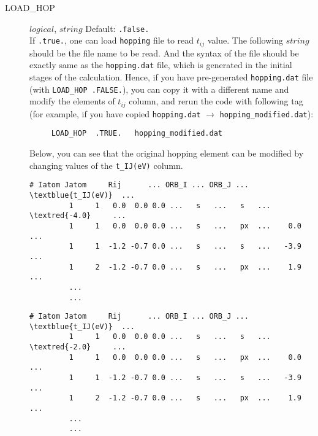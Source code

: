 \documentclass[a4paper,12pt]{scrartcl}
\makeatletter
\def\namedlabel#1#2{\begingroup
    #2%
    \def\@currentlabel{#2}%
    \phantomsection\label{#1}\endgroup
}
\newcommand{\textred}[1]{\textcolor{red!85!white}{\texttt{#1}}}
\newcommand{\textblue}[1]{\textcolor{blue!85!white}{\texttt{#1}}}
\makeatother
\begin{document}
\begin{description}
    \item[\namedlabel{tag:LOADHOP}{LOAD\_HOP}] $logical$, $string$ Default: \texttt{.false.} \\
		If \texttt{.true.}, one can load \texttt{hopping} file to read $t_{ij}$ value. The following $string$ should be the file name to be read. And the syntax of the file should be exactly same as the \texttt{hopping.dat} file, which is generated in the initial stages of the calculation.
		Hence, if you have pre-generated \texttt{hopping.dat} file (with \texttt{LOAD\_HOP .FALSE.}), you can copy it with a different name and modify the elements of $t_{ij}$ column, and rerun the code with following tag (for example, if you have copied \texttt{hopping.dat} $\rightarrow$ \texttt{hopping\_modified.dat}):
		
    \begin{verbatim}
     LOAD_HOP  .TRUE.   hopping_modified.dat
    \end{verbatim}

		Below, you can see that the original hopping element can be modified by changing values of the \textblue{t\_IJ(eV)} column.  
        \begin{Verbatim}[commandchars=\\\{\},gobble=4, frame=single, framesep=2mm, 
            label= hopping.dat example file, 
            labelposition=bottomline]
     # Iatom Jatom     Rij      ... ORB_I ... ORB_J ...  \textblue{t_IJ(eV)}  ... 
         1     1   0.0  0.0 0.0 ...   s   ...   s   ...   \textred{-4.0}     ... 
         1     1   0.0  0.0 0.0 ...   s   ...   px  ...    0.0     ... 
         1     1  -1.2 -0.7 0.0 ...   s   ...   s   ...   -3.9     ... 
         1     2  -1.2 -0.7 0.0 ...   s   ...   px  ...    1.9     ... 
         ...
         ...
        \end{Verbatim}

        \begin{Verbatim}[commandchars=\\\{\},gobble=4, frame=single, framesep=2mm, 
            label= hopping\_modified.dat example file, 
            labelposition=bottomline]
     # Iatom Jatom     Rij      ... ORB_I ... ORB_J ...  \textblue{t_IJ(eV)}  ... 
         1     1   0.0  0.0 0.0 ...   s   ...   s   ...   \textred{-2.0}     ... 
         1     1   0.0  0.0 0.0 ...   s   ...   px  ...    0.0     ... 
         1     1  -1.2 -0.7 0.0 ...   s   ...   s   ...   -3.9     ... 
         1     2  -1.2 -0.7 0.0 ...   s   ...   px  ...    1.9     ... 
         ...
         ...
        \end{Verbatim}



\end{description}
\end{document}
